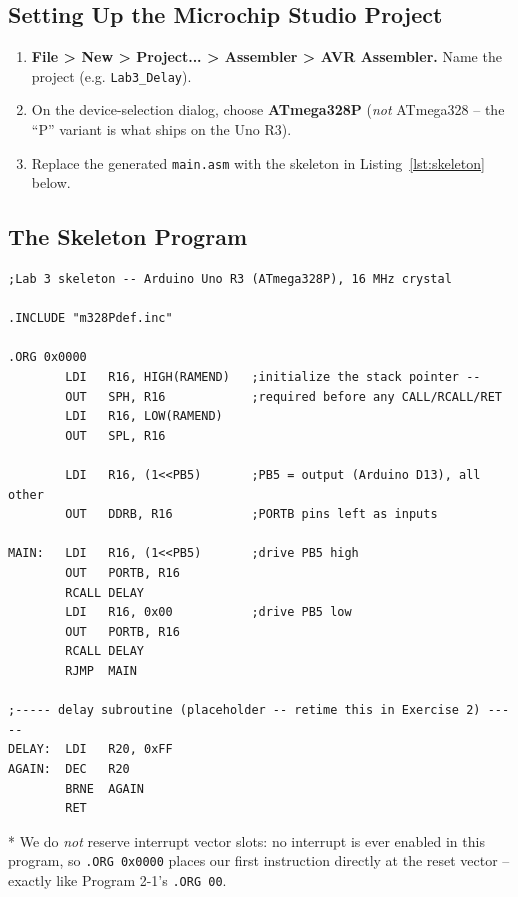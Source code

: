 \documentclass[11pt]{article}
\begin{document}
\subsection*{Setting Up the Microchip Studio Project}
\begin{enumerate}[leftmargin=*,nosep]
  \item \textbf{File > New > Project... > Assembler > AVR Assembler.} Name the
        project (e.g. \texttt{Lab3\_Delay}).
  \item On the device-selection dialog, choose \textbf{ATmega328P} (\emph{not}
        ATmega328 -- the ``P'' variant is what ships on the Uno R3).
  \item Replace the generated \texttt{main.asm} with the skeleton in
        Listing~\ref{lst:skeleton} below.
\end{enumerate}

\subsection*{The Skeleton Program}

\begin{lstlisting}[caption={Skeleton: blink-check on PB5 (Arduino D13). The delay is
a placeholder -- not yet timed.},label={lst:skeleton}]
;Lab 3 skeleton -- Arduino Uno R3 (ATmega328P), 16 MHz crystal

.INCLUDE "m328Pdef.inc"

.ORG 0x0000
        LDI   R16, HIGH(RAMEND)   ;initialize the stack pointer --
        OUT   SPH, R16            ;required before any CALL/RCALL/RET
        LDI   R16, LOW(RAMEND)
        OUT   SPL, R16

        LDI   R16, (1<<PB5)       ;PB5 = output (Arduino D13), all other
        OUT   DDRB, R16           ;PORTB pins left as inputs

MAIN:   LDI   R16, (1<<PB5)       ;drive PB5 high
        OUT   PORTB, R16
        RCALL DELAY
        LDI   R16, 0x00           ;drive PB5 low
        OUT   PORTB, R16
        RCALL DELAY
        RJMP  MAIN

;----- delay subroutine (placeholder -- retime this in Exercise 2) -----
DELAY:  LDI   R20, 0xFF
AGAIN:  DEC   R20
        BRNE  AGAIN
        RET
\end{lstlisting}

* We do \emph{not} reserve interrupt vector slots: no interrupt is ever enabled in
this program, so \texttt{.ORG 0x0000} places our first instruction directly at the
reset vector -- exactly like Program 2-1's \texttt{.ORG 00}.
\end{document}
